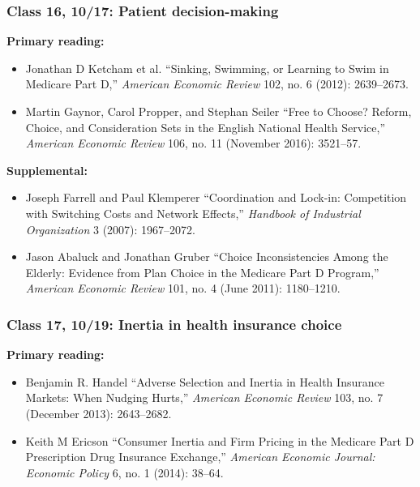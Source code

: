 \documentclass[11pt,]{article}
\providecommand{\tightlist}{%
  \setlength{\itemsep}{0pt}\setlength{\parskip}{0pt}}
\begin{document}
\hypertarget{class-16-1017-patient-decision-making}{%
\subsubsection{Class 16, 10/17: Patient
decision-making}\label{class-16-1017-patient-decision-making}}

\textbf{Primary reading:}

\begin{itemize}
\tightlist
\item
  Jonathan D Ketcham et al. {``Sinking, Swimming, or Learning to Swim in
  {Medicare} {Part} {D},''} \emph{American Economic Review} 102, no. 6
  (2012): 2639--2673.
\item
  Martin Gaynor, Carol Propper, and Stephan Seiler {``Free to {Choose}?
  {Reform}, {Choice}, and {Consideration} {Sets} in the {English}
  {National} {Health} {Service},''} \emph{American Economic Review} 106,
  no. 11 (November 2016): 3521--57.
\end{itemize}

\textbf{Supplemental:}

\begin{itemize}
\tightlist
\item
  Joseph Farrell and Paul Klemperer {``Coordination and Lock-in:
  {Competition} with Switching Costs and Network Effects,''}
  \emph{Handbook of Industrial Organization} 3 (2007): 1967--2072.
\item
  Jason Abaluck and Jonathan Gruber {``Choice {Inconsistencies} Among
  the {Elderly}: {Evidence} from {Plan} {Choice} in the {Medicare}
  {Part} {D} {Program},''} \emph{American Economic Review} 101, no. 4
  (June 2011): 1180--1210.
\end{itemize}

\hypertarget{class-17-1019-inertia-in-health-insurance-choice}{%
\subsubsection{Class 17, 10/19: Inertia in health insurance
choice}\label{class-17-1019-inertia-in-health-insurance-choice}}

\textbf{Primary reading:}

\begin{itemize}
\tightlist
\item
  Benjamin R. Handel {``Adverse {Selection} and {Inertia} in {Health}
  {Insurance} {Markets}: {When} {Nudging} {Hurts},''} \emph{American
  Economic Review} 103, no. 7 (December 2013): 2643--2682.
\item
  Keith M Ericson {``Consumer Inertia and Firm Pricing in the {Medicare}
  {Part} {D} Prescription Drug Insurance Exchange,''} \emph{American
  Economic Journal: Economic Policy} 6, no. 1 (2014): 38--64.
\end{itemize}
\end{document}
